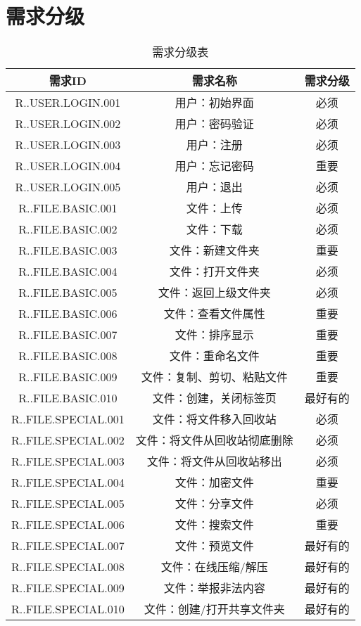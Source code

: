 \chapter{需求分级}
\begin{table}[htbp]
\centering
\caption{需求分级表} \label{tab:classification}
\begin{tabular}{|c|c|c|}
    \hline
    需求ID & 需求名称 & 需求分级 \\
    \hline
    R..USER.LOGIN.001 & 用户：初始界面 & 必须 \\
    \hline
    R..USER.LOGIN.002 & 用户：密码验证 & 必须 \\
    \hline 
    R..USER.LOGIN.003 & 用户：注册 & 必须 \\
    \hline
    R..USER.LOGIN.004 & 用户：忘记密码 & 重要 \\
    \hline
    R..USER.LOGIN.005 & 用户：退出 & 必须 \\
    \hline
    R..FILE.BASIC.001 & 文件：上传 & 必须 \\
    \hline
    R..FILE.BASIC.002 & 文件：下载 & 必须 \\
    \hline
    R..FILE.BASIC.003 & 文件：新建文件夹 & 重要 \\
    \hline
    R..FILE.BASIC.004 & 文件：打开文件夹 & 必须 \\
    \hline
    R..FILE.BASIC.005 & 文件：返回上级文件夹 & 必须 \\
    \hline
    R..FILE.BASIC.006 & 文件：查看文件属性 & 重要 \\
    \hline
    R..FILE.BASIC.007 & 文件：排序显示 & 重要 \\
    \hline
    R..FILE.BASIC.008 & 文件：重命名文件 & 重要 \\
    \hline
    R..FILE.BASIC.009 & 文件：复制、剪切、粘贴文件 & 重要 \\
    \hline
    R..FILE.BASIC.010 & 文件：创建，关闭标签页 & 最好有的 \\
    \hline
    R..FILE.SPECIAL.001 & 文件：将文件移入回收站 & 必须 \\
    \hline
    R..FILE.SPECIAL.002 & 文件：将文件从回收站彻底删除 & 必须 \\
    \hline
    R..FILE.SPECIAL.003 & 文件：将文件从回收站移出 & 必须 \\
    \hline
    R..FILE.SPECIAL.004 & 文件：加密文件 & 重要 \\
    \hline
    R..FILE.SPECIAL.005 & 文件：分享文件 & 必须 \\
    \hline
    R..FILE.SPECIAL.006 & 文件：搜索文件 & 重要 \\
    \hline
    R..FILE.SPECIAL.007 & 文件：预览文件 & 最好有的 \\
    \hline
    R..FILE.SPECIAL.008 & 文件：在线压缩/解压 & 最好有的 \\
    \hline
    R..FILE.SPECIAL.009 & 文件：举报非法内容 & 最好有的 \\
    \hline
    R..FILE.SPECIAL.010 & 文件：创建/打开共享文件夹 & 最好有的 \\
    \hline
\end{tabular}
\end{table}

